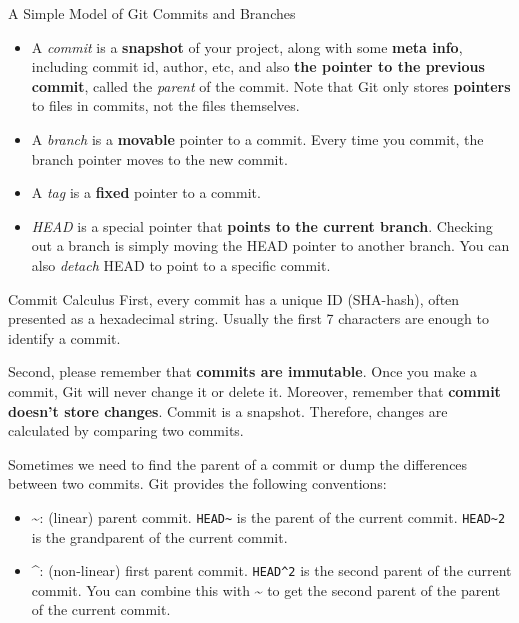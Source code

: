 \documentclass[aspectratio=169]{beamer}
\begin{document}
\begin{frame}{A Simple Model of Git Commits and Branches}
    \begin{itemize}
        \item A \emph{commit} is a \textbf{snapshot} of your project, along with some \textbf{meta info}, including commit id, author, etc, and also \textbf{the pointer to the previous commit}, called the \emph{parent} of the commit. Note that Git only stores \textbf{pointers} to files in commits, not the files themselves.
        \item A \emph{branch} is a \textbf{movable} pointer to a commit. Every time you commit, the branch pointer moves to the new commit.
        \item A \emph{tag} is a \textbf{fixed} pointer to a commit.
        \item \emph{HEAD} is a special pointer that \textbf{points to the current branch}. Checking out a branch is simply moving the HEAD pointer to another branch. You can also \emph{detach} HEAD to point to a specific commit.
    \end{itemize}
\end{frame}

\begin{frame}{Commit Calculus}
    First, every commit has a unique ID (SHA-hash), often presented as a hexadecimal string. Usually the first 7 characters are enough to identify a commit.

    \smallskip
    \pause

    Second, please remember that \textbf{commits are immutable}. Once you make a commit, Git will never change it or delete it. Moreover, remember that \textbf{commit doesn't store changes}. Commit is a snapshot. Therefore, changes are calculated by comparing two commits.

    \smallskip
    \pause

    Sometimes we need to find the parent of a commit or dump the differences between two commits. Git provides the following conventions:
    \begin{itemize}
        \item \~{}: (linear) parent commit. \texttt{HEAD\~{}} is the parent of the current commit. \texttt{HEAD\~{}2} is the grandparent of the current commit.
        \item \^{}: (non-linear) first parent commit. \texttt{HEAD\^{}2} is the second parent of the current commit. You can combine this with \~{} to get the second parent of the parent of the current commit.
    \end{itemize}
\end{frame}
\end{document}
